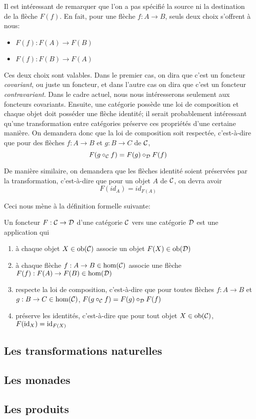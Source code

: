 Il est intéressant de remarquer que l'on a pas spécifié la source ni la
destination de la flèche $F(f)$. En fait, pour une flèche $f : A \to B$,
seuls deux choix s'offrent à nous:
\begin{itemize}
    \item $F(f) : F(A) \to F(B)$
    \item $F(f) : F(B) \to F(A)$
\end{itemize}

Ces deux choix sont valables. Dans le premier cas, on dira que c'est un
foncteur \textit{covariant}, ou juste un foncteur, et dans l'autre cas on
dira que c'est un foncteur \textit{contravariant}. Dans le cadre actuel,
nous nous intéresserons seulement aux foncteurs covariants. Ensuite, une
catégorie possède une loi de composition et chaque objet doit posséder une
flèche identité; il serait probablement intéressant qu'une transformation
entre catégories préserve ces propriétés d'une certaine manière. On demandera
donc que la loi de composition soit respectée, c'est-à-dire que pour des
flèches $f : A \to B$ et $g : B \to C$ de $\mathcal{C}$,
\[
    F(g \circ_{\mathcal{C}} f) = F(g) \circ_{\mathcal{D}} F(f)
\]

De manière similaire, on demandera que les flèches identité soient préservées
par la transformation, c'est-à-dire que pour un objet $A$ de $\mathcal{C}$, on devra
avoir
\[
    F(id_A) = id_{F(A)}
\]

Ceci nous mène à la définition formelle suivante:

\begin{définition}[Foncteur]
    Un foncteur $F : \mathcal{C} \to \mathcal{D}$ d'une catégorie $\mathcal{C}$ vers une catégorie $\mathcal{D}$
    est une application qui
    \begin{enumerate}
        \item à chaque objet $X \in \mathrm{ob}(\mathcal{C})$ associe un objet $F(X) \in \mathrm{ob}(\mathcal{D})$
        \item à chaque flèche $f : A \to B \in \hom(\mathcal{C})$ associe une flèche
              $F(f) : F(A) \to F(B) \in \hom(\mathcal{D})$
        \item respecte la loi de composition, c'est-à-dire que pour toutes
              flèches $f : A \to B$ et $g : B \to C \in \hom(\mathcal{C})$,
              $F(g \circ_{\mathcal{C}} f) = F(g) \circ_{\mathcal{D}} F(f)$
        \item préserve les identités, c'est-à-dire que pour tout objet
              $X \in \mathrm{ob}(\mathcal{C})$, $F(\mathrm{id}_X) = \mathrm{id}_{F(X)}$
    \end{enumerate}
\end{définition}


\subsection{Les transformations naturelles}
\subsection{Les monades}
\subsection{Les produits}
